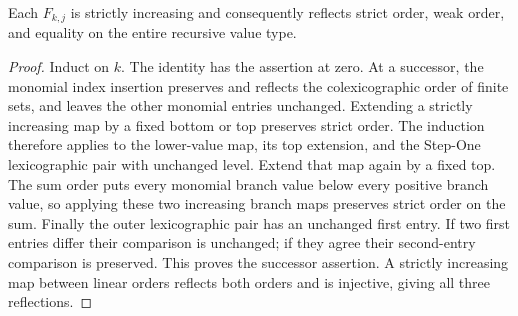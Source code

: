 \begin{lemma}
\label{hir:original-invariant-empty-map-strict}
\leanok
{}
Each $F_{k,j}$ is strictly increasing and consequently reflects strict order,
weak order, and equality on the entire recursive value type.
\end{lemma}
\begin{proof}
Induct on $k$. The identity has the assertion at zero. At a successor, the
monomial index insertion preserves and reflects the colexicographic order
of finite sets, and leaves the other monomial entries unchanged. Extending a
strictly increasing map by a fixed bottom or top preserves strict order.
The induction therefore applies to the lower-value map, its top extension,
and the Step-One lexicographic pair with unchanged level. Extend that map
again by a fixed top. The sum order puts every monomial branch value below
every positive branch value, so applying these two increasing branch maps
preserves strict order on the sum. Finally the outer lexicographic pair has
an unchanged first entry. If two first entries differ their comparison is
unchanged; if they agree their second-entry comparison is preserved. This
proves the successor assertion. A strictly increasing map between linear
orders reflects both orders and is injective, giving all three reflections.
\end{proof}

